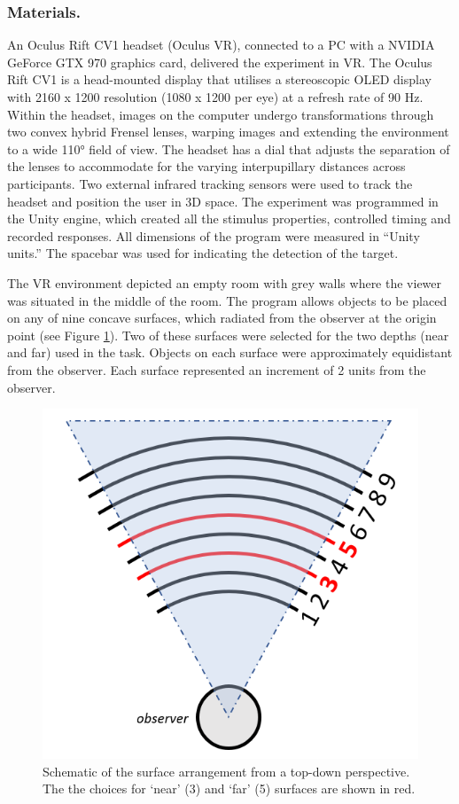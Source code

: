 \documentclass[
  english,
  man,floatsintext]{apa7}
\begin{document}
\hypertarget{materials.}{%
\subsubsection{Materials.}\label{materials.}}

An Oculus Rift CV1 headset (Oculus VR), connected to a PC with a NVIDIA GeForce GTX 970 graphics card, delivered the experiment in VR. The Oculus Rift CV1 is a head-mounted display that utilises a stereoscopic OLED display with 2160 x 1200 resolution (1080 x 1200 per eye) at a refresh rate of 90 Hz. Within the headset, images on the computer undergo transformations through two convex hybrid Frensel lenses, warping images and extending the environment to a wide 110° field of view. The headset has a dial that adjusts the separation of the lenses to accommodate for the varying interpupillary distances across participants. Two external infrared tracking sensors were used to track the headset and position the user in 3D space. The experiment was programmed in the Unity engine, which created all the stimulus properties, controlled timing and recorded responses. All dimensions of the program were measured in ``Unity units.'' The spacebar was used for indicating the detection of the target.

The VR environment depicted an empty room with grey walls where the viewer was situated in the middle of the room. The program allows objects to be placed on any of nine concave surfaces, which radiated from the observer at the origin point (see Figure \ref{fig:schematic}). Two of these surfaces were selected for the two depths (near and far) used in the task. Objects on each surface were approximately equidistant from the observer. Each surface represented an increment of 2 units from the observer.



\begin{figure}

{\centering \includegraphics[width=0.6\linewidth]{VR_schematic} 

}

\caption{Schematic of the surface arrangement from a top-down perspective. The the choices for `near' (3) and `far' (5) surfaces are shown in red.}\label{fig:schematic}
\end{figure}
\end{document}
